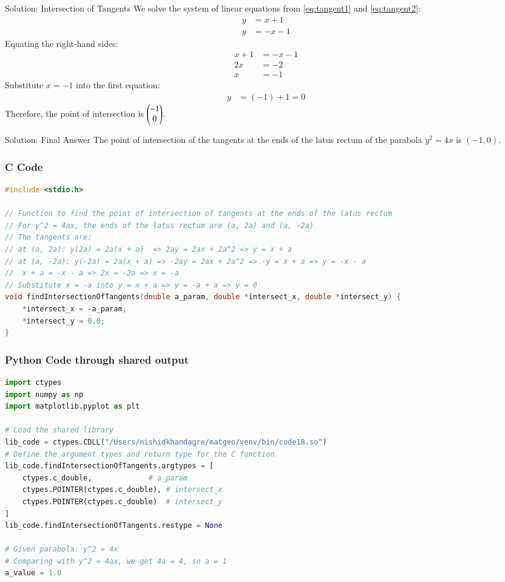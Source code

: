 \documentclass{beamer}
\begin{document}
\begin{frame}{Solution: Intersection of Tangents}
We solve the system of linear equations from \ref{eq:tangent1} and \ref{eq:tangent2}:
\begin{align*}
y &= x+1 \\
y &= -x-1
\end{align*}
Equating the right-hand sides:
\begin{align*}
x+1 &= -x-1 \\
2x &= -2 \\
x &= -1
\end{align*}
Substitute $x=-1$ into the first equation:
\begin{align*}
y &= (-1) + 1 = 0
\end{align*}
Therefore, the point of intersection is $\begin{pmatrix}-1 \\ 0\end{pmatrix}$.
\end{frame}

\begin{frame}{Solution: Final Answer}
The point of intersection of the tangents at the ends of the latus rectum of the parabola $y^2 = 4x$ is $\boxed{(-1, 0)}$.
\end{frame}

\begin{frame}[fragile]
\frametitle{C Code}
\begin{lstlisting}[language=C]
#include <stdio.h>

// Function to find the point of intersection of tangents at the ends of the latus rectum
// For y^2 = 4ax, the ends of the latus rectum are (a, 2a) and (a, -2a)
// The tangents are:
// at (a, 2a): y(2a) = 2a(x + a)  => 2ay = 2ax + 2a^2 => y = x + a
// at (a, -2a): y(-2a) = 2a(x + a) => -2ay = 2ax + 2a^2 => -y = x + a => y = -x - a
//  x + a = -x - a => 2x = -2a => x = -a
// Substitute x = -a into y = x + a => y = -a + a => y = 0
void findIntersectionOfTangents(double a_param, double *intersect_x, double *intersect_y) {
    *intersect_x = -a_param;
    *intersect_y = 0.0;
}
\end{lstlisting}
\end{frame}

\begin{frame}[fragile]
\frametitle{Python Code through shared output}
\begin{lstlisting}[language=Python]
import ctypes
import numpy as np
import matplotlib.pyplot as plt

# Load the shared library
lib_code = ctypes.CDLL("/Users/nishidkhandagre/matgeo/venv/bin/code18.so")
# Define the argument types and return type for the C function
lib_code.findIntersectionOfTangents.argtypes = [
    ctypes.c_double,             # a_param
    ctypes.POINTER(ctypes.c_double), # intersect_x
    ctypes.POINTER(ctypes.c_double)  # intersect_y
]
lib_code.findIntersectionOfTangents.restype = None

# Given parabola: y^2 = 4x
# Comparing with y^2 = 4ax, we get 4a = 4, so a = 1
a_value = 1.0
\end{lstlisting}
\end{frame}
\end{document}
